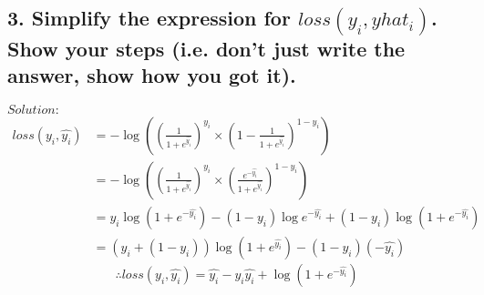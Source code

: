 \documentclass[12pt]{extarticle}
\newcommand{\<}{\langle}
\renewcommand{\>}{\rangle}
\theoremstyle{definition}
\begin{document}
\subsection*{3. Simplify the expression for $loss(y_i, yhat_i)$. Show your steps (i.e. don’t just write the answer, show how you got it).}
$Solution:$ 
\begin{align*}
 loss(y_i,\hat{y_i}) &= -\log{((\frac{1}{1+e^{\hat{y_i}}})^{y_i} \times (1-\frac{1}{1+e^{\hat{y_i}}})^{1-y_i})}\\
 &= -\log{((\frac{1}{1+e^{\hat{y_i}}})^{y_i} \times (\frac{e^{-\hat{y_i}}}{1+e^{\hat{y_i}}})^{1-y_i})}\\
 &= y_i\log{(1+e^{-\hat{y_i}})} - (1-y_i)\log{e^{-\hat{y_i}}} + (1-y_i)\log{(1+e^{-\hat{y_i}})}\\
 &= (y_i+(1-y_i))\log{(1+e^{\hat{y_i}})} - (1-y_i)(-\hat{y_i})
\end{align*}
\begin{equation}
 \therefore loss(y_i,\hat{y_i}) = \hat{y_i} - {y_i}{\hat{y_i}} + \log{(1+e^{-\hat{y_i}})}
\label{eq3}\end{equation}
\newline\newline
\end{document}
